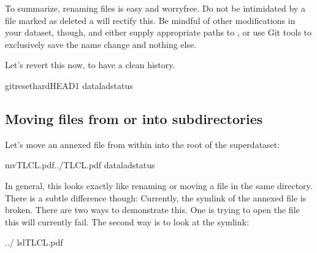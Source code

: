\sphinxAtStartPar
To summarize, renaming files is easy and worry\sphinxhyphen{}free. Do not be intimidated
by a file marked as deleted \textendash{} a  will rectify this.
Be mindful of other modifications in your dataset, though, and either supply
appropriate paths to , or use Git tools to exclusively save
the name change and nothing else.

\sphinxAtStartPar
Let’s revert this now, to have a clean history.

\begin{sphinxVerbatim}[commandchars=\\\{\}]
gitreset\PYGZhy{}\PYGZhy{}hardHEAD\PYGZti{}1
dataladstatus
\end{sphinxVerbatim}


\subsection{Moving files from or into subdirectories}
\label{\detokenize{basics/101-136-filesystem:moving-files-from-or-into-subdirectories}}
\sphinxAtStartPar
Let’s move an annexed file from within  into the root
of the superdataset:

\begin{sphinxVerbatim}[commandchars=\\\{\}]
mvTLCL.pdf../TLCL.pdf
dataladstatus
\end{sphinxVerbatim}

\sphinxAtStartPar
In general, this looks exactly like renaming or moving a file
in the same directory. There is a subtle difference though:
Currently, the symlink of the annexed file is broken. There
are two ways to demonstrate this. One is trying to open the
file \textendash{} this will currently fail. The second way is to look
at the symlink:

\begin{sphinxVerbatim}[commandchars=\\\{\}]
../
ls\PYGZhy{}lTLCL.pdf
\end{sphinxVerbatim}

